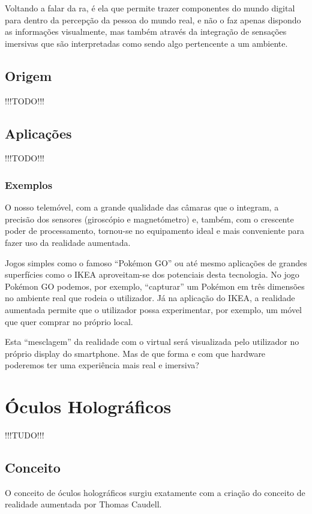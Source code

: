 \documentclass{report}
\begin{document}
Voltando a falar da \ac{ra}, é ela que permite trazer componentes do mundo digital para dentro da percepção da pessoa do mundo real, e não o faz apenas dispondo as informações visualmente, mas também através da integração de sensações imersivas que são interpretadas como sendo algo pertencente a um ambiente.

\section{Origem}
!!!TODO!!!

\section{Aplicações}
!!!TODO!!!

\subsection{Exemplos}
O nosso telemóvel, com a grande qualidade das câmaras que o integram, a precisão dos sensores (giroscópio e magnetómetro) e, também, com o crescente poder de processamento, tornou-se no equipamento ideal e mais conveniente para fazer uso da realidade aumentada.

Jogos simples como o famoso “Pokémon GO” ou até mesmo aplicações de grandes superfícies como o IKEA aproveitam-se dos potenciais desta tecnologia. No jogo Pokémon GO podemos, por exemplo, “capturar” um Pokémon em três dimensões no ambiente real que rodeia o utilizador. Já na aplicação do IKEA, a realidade
aumentada permite que o utilizador possa experimentar, por exemplo, um móvel que quer comprar no próprio local.

Esta “mesclagem” da realidade com o virtual será visualizada pelo utilizador no próprio display do smartphone. Mas de que forma e com que hardware poderemos ter uma experiência mais real e imersiva?

\chapter{Óculos Holográficos}
\label{chap.oculos-holograficos}
!!!TUDO!!!

\section{Conceito}
O conceito de óculos holográficos surgiu exatamente com a criação do conceito de realidade aumentada por Thomas Caudell.
\end{document}
